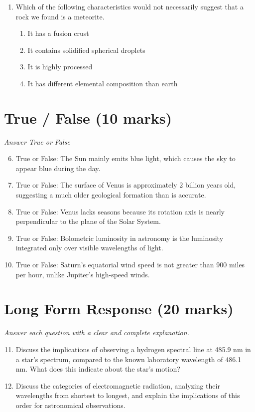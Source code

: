 \documentclass[12pt]{article}
\begin{document}
\begin{enumerate}[label=\arabic*.]
\begin{enumerate}[label=(\alph*)]
    \item Because the atmosphere preferentially scatters short wavelengths.
    \item Because the Earth's atmosphere preferentially absorbs all other colors.
\end{enumerate}
\item Which of the following characteristics would not necessarily suggest that a rock we found
is a meteorite.
\begin{enumerate}[label=(\alph*)]
    \item It has a fusion crust
    \item It contains solidified spherical droplets
    \item It is highly processed
    \item It has different elemental composition than earth
\end{enumerate}
\end{enumerate}

\section*{True / False (10 marks)}
\textit{Answer True or False}
\begin{enumerate}[label=\arabic*.]
\setcounter{enumi}{5}
\item True or False: The Sun mainly emits blue light, which causes the sky to appear blue during the day.
\item True or False: The surface of Venus is approximately 2 billion years old, suggesting a much older geological formation than is accurate.
\item True or False: Venus lacks seasons because its rotation axis is nearly perpendicular to the plane of the Solar System.
\item True or False: Bolometric luminosity in astronomy is the luminosity integrated only over visible wavelengths of light.
\item True or False: Saturn's equatorial wind speed is not greater than 900 miles per hour, unlike Jupiter's high-speed winds.
\end{enumerate}

\section*{Long Form Response (20 marks)}
\textit{Answer each question with a clear and complete explanation.}
\begin{enumerate}[label=\arabic*.]
\setcounter{enumi}{10}
\item Discuss the implications of observing a hydrogen spectral line at 485.9 nm in a star's
spectrum, compared to the known laboratory wavelength of 486.1 nm. What does this indicate
about the star's motion?
\item Discuss the categories of electromagnetic radiation, analyzing their wavelengths from
shortest to longest, and explain the implications of this order for astronomical
observations.
\end{enumerate}
\end{document}
